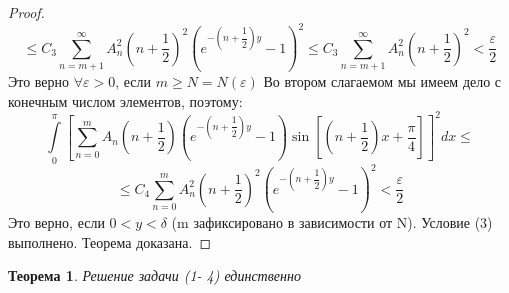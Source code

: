 \documentclass[a4paper, 9pt]{article}
\newtheorem{theorem}{Теорема}
\begin{document}
\begin{proof}
\begin{equation*}
		\leq  C_3 \sum\limits_{n=m+1}^{\infty} A_n^2 \left(n+\dfrac12\right)^2 \left(e^{-\left(n+\dfrac12\right)y} - 1\right)^2 \leq C_3 \sum\limits_{n=m+1}^{\infty} A_n^2 \left(n+\dfrac12\right)^2 < \dfrac{\varepsilon}{2}
	\end{equation*}
	Это верно $\forall \varepsilon > 0$, если $m \geq N =N(\varepsilon)$\newline
	Во втором слагаемом мы имеем дело с конечным числом элементов, поэтому:
	\begin{equation*}
		\int\limits_0^\pi \left[	\sum\limits_{n=0}^{m} A_n\left(n+\dfrac12\right) \left( e^{-\left(n+\dfrac12\right)y} - 1\right) \sin{\left[\left(n+\dfrac12\right) x  + \dfrac\pi4\right]} \right]^2 dx \leq
	\end{equation*}
	\begin{equation*}
		\leq C_4 \sum\limits_{n=0}^{m} A_n^2 \left(n +\dfrac12\right)^2 \left(e^{-\left(n+\dfrac12\right)y} - 1\right)^2 < \dfrac{\varepsilon}{2}
	\end{equation*}
	Это верно, если $0 < y < \delta$ (m зафиксировано в зависимости от N). Условие (3) выполнено. Теорема доказана.
	\end{proof}
	\begin{theorem}
		Решение задачи (1- 4) единственно
	\end{theorem}
\end{document}
